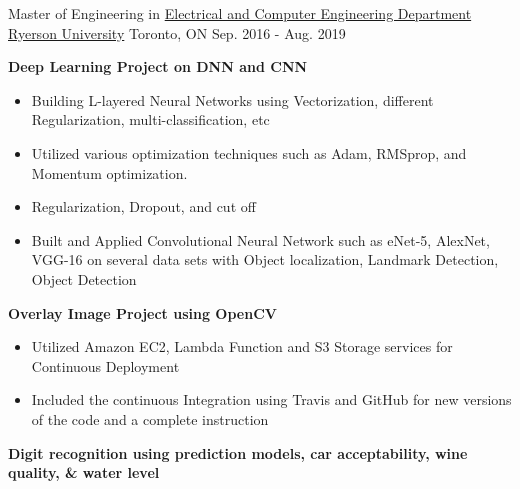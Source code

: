 



\begin{cventries}


  \cventry
    {Master of Engineering in \href{https://www.ee.ryerson.ca}{Electrical and Computer Engineering Department}} %
    {\href{https://www.ryerson.ca}{Ryerson University}} %
    {Toronto, ON} %
    {Sep. 2016 - Aug. 2019} %
    {
      \begin{cvitems} %
      \item \textbf{Deep Learning Project on DNN and CNN}
		\begin{itemize}
			 \item Building L-layered Neural Networks using Vectorization, different Regularization, multi-classification, etc
			 \item Utilized various optimization techniques such as Adam, RMSprop, and Momentum optimization.
			 \item Regularization, Dropout, and cut off
             \item Built and Applied Convolutional Neural Network such as eNet-5, AlexNet, VGG-16 on several data sets with Object localization, Landmark Detection, Object Detection
		\end{itemize}
      \item \textbf{Overlay Image Project using OpenCV}
		\begin{itemize}
			 \item Utilized Amazon EC2, Lambda Function and S3 Storage services for Continuous Deployment
        	 \item Included the continuous Integration using Travis and GitHub for new versions of the code and a complete instruction
		\end{itemize}
		\item \textbf{Digit recognition using prediction models, car acceptability, wine quality, \& water level}

\end{cvitems}}
\end{cventries}
